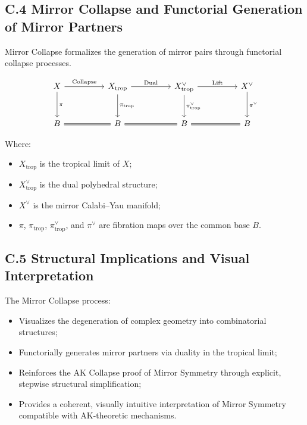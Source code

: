 \documentclass[11pt]{article}
\begin{document}
\subsection*{C.4 Mirror Collapse and Functorial Generation of Mirror Partners}

Mirror Collapse formalizes the generation of mirror pairs through functorial collapse processes.

\[
\begin{tikzcd}[column sep=huge, row sep=large]
X \arrow[r, "\mathrm{Collapse}"] \arrow[d, "\pi"]
& X_{\mathrm{trop}} \arrow[d, "\pi_{\mathrm{trop}}"] \arrow[r, "\mathrm{Dual}"]
& X_{\mathrm{trop}}^\vee \arrow[d, "\pi_{\mathrm{trop}}^\vee"] \arrow[r, "\mathrm{Lift}"]
& X^\vee \arrow[d, "\pi^\vee"] \\
B \arrow[r, equals]
& B \arrow[r, equals]
& B \arrow[r, equals]
& B
\end{tikzcd}
\]

Where:

\begin{itemize}
    \item $X_{\mathrm{trop}}$ is the tropical limit of $X$;
    \item $X_{\mathrm{trop}}^\vee$ is the dual polyhedral structure;
    \item $X^\vee$ is the mirror Calabi--Yau manifold;
    \item $\pi$, $\pi_{\mathrm{trop}}$, $\pi_{\mathrm{trop}}^\vee$, and $\pi^\vee$ are fibration maps over the common base $B$.
\end{itemize}

\subsection*{C.5 Structural Implications and Visual Interpretation}

The Mirror Collapse process:

\begin{itemize}
    \item Visualizes the degeneration of complex geometry into combinatorial structures;
    \item Functorially generates mirror partners via duality in the tropical limit;
    \item Reinforces the AK Collapse proof of Mirror Symmetry through explicit, stepwise structural simplification;
    \item Provides a coherent, visually intuitive interpretation of Mirror Symmetry compatible with AK-theoretic mechanisms.
\end{itemize}
\end{document}
